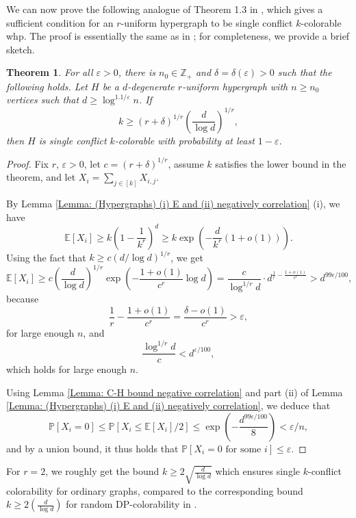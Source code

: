 \documentclass[12pt]{article}
\newtheorem{theorem}{Theorem}[section]
\newcommand{\E}{\mathbb{E}}
\renewcommand{\P}{\mathbb{P}}
\newcommand{\1}{\mathds{1}}
\newcommand{\Z}{\mathbb{Z}}
\begin{document}
We can now prove the following analogue of Theorem 1.3 in \cite{BernshteynDominikKaulMudrock},
which gives a sufficient condition for an $r$-uniform hypergraph to be single conflict $k$-colorable whp.
The proof is essentially the same as in \cite{BernshteynDominikKaulMudrock}; for completeness, we provide
a brief sketch.

\begin{theorem}
    \label{Theorem: d-degenerate r-uniform hypergraphs}
    For all $\varepsilon>0$, there is $n_0\in \Z_+$ and $\delta=\delta(\varepsilon)>0$ such that the following holds. Let $H$ be a $d$-degenerate $r$-uniform hypergraph with $n\geq n_0$ vertices such that 
$d\geq \log ^{1.1/\varepsilon}n$. If
    $$
    k\geq (r+\delta)^{1/r}\left(\frac{d}{\log d}\right)^{1/r},
    $$
    then $H$ is single conflict $k$-colorable with probability at least $1-\varepsilon$.
\end{theorem}

\begin{proof}
    Fix $r$, $\varepsilon>0$, let $c=(r+\delta)^{1/r}$, assume $k$ satisfies the lower bound in the theorem, and let
	$X_i = \sum_{j \in [k]} X_{i,j}$. %
    
    By Lemma \ref{Lemma: (Hypergraphs) (i) E and (ii) negatively correlation} (i), we have
    $$
    \E[X_i]\geq k\left(1-\frac{1}{k^r}\right)^{d}\geq k\exp\left(-\frac{d}{k^r}(1+o(1))\right).
    $$
    Using the fact that $k\geq c(d/\log d)^{1/r}$, we get
    $$
    \E[X_i]\geq c\left(\frac{d}{\log d}\right)^{1/r}\exp\left(-\frac{1+o(1)}{c^r}\log d\right) =\frac{c}{\log^{1/r}d}\cdot d^{\frac{1}{r}-\frac{1+o(1)}{c^r}}>d^{99\epsilon/100},
    $$
    because
    $$
    \frac{1}{r}-\frac{1+o(1)}{c^r}= 
    \frac{\delta-o(1)}{c^r}>\varepsilon,
    $$
    for large enough $n$, 
	and
    $$
    \frac{\log^{1/r}d}{c}< d^{\varepsilon/100}, 
    $$
    which holds for large enough $n$. 
	
	Using Lemma \ref{Lemma: C-H bound negative correlation} and part (ii) 
	of Lemma \ref{Lemma: (Hypergraphs) (i) E and (ii) negatively correlation},
	we deduce that 
$$\P[X_i=0] \leq \P[X_i \leq \E[X_i]/2] \leq \exp \left(-\frac{d^{99\epsilon/100}}{8}  \right) < \varepsilon/n,$$
and by a union bound, it thus holds that
$\P[X_i = 0 \text{ for some $i$}]\leq \varepsilon$.
\end{proof}


For $r=2$, we roughly get the bound $k \geq 2 \sqrt{\frac{d}{\log d}}$ 
which ensures single $k$-conflict colorability
for ordinary graphs,
compared to the corresponding bound $k \geq  2 \left(\frac{d}{\log d}\right)$ for random
DP-colorability in \cite{BernshteynDominikKaulMudrock}.
\end{document}

